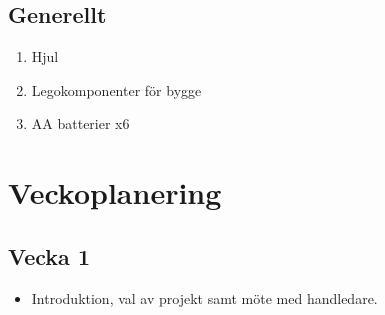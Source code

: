 \documentclass[a4paper]{article}
\begin{document}
\subsection*{Generellt}

\begin{enumerate}
\item [] Hjul
\item [] Legokomponenter för bygge
\item [] AA batterier x6
\end{enumerate}

\newpage

\section{Veckoplanering}

	\subsection*{Vecka 1}
    
    \begin{itemize}
    \item Introduktion, val av projekt samt möte med handledare.
	\end{itemize}
\end{document}
